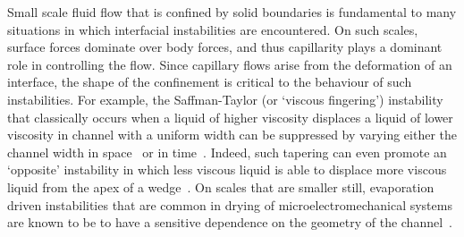 \documentclass{jfm}
\begin{document}

Small scale fluid flow that is confined by solid boundaries is fundamental to many situations in which interfacial instabilities are encountered.  On such scales, surface forces dominate over body forces, and thus capillarity plays a dominant role in controlling the flow. Since capillary flows arise from the deformation of an interface, the shape of the confinement is critical to the behaviour of such instabilities. For example, the Saffman-Taylor (or `viscous fingering') instability~\citep{Saffman1958PRSL} that classically occurs when a liquid of higher viscosity displaces a liquid of lower viscosity in channel with a uniform width can be suppressed by varying either the channel width in space~\citep{AlHousseiny2012NaturePhysics, AlHousseiny2013PhysFlu, Reyssat2014JFM} or in time~\citep{Zheng2015PRL}. Indeed, such tapering can even promote an `opposite' instability in which less viscous liquid is able to displace more viscous liquid from the apex of a wedge~\citep{Keiser2016JFM}. On scales that are smaller still, evaporation driven instabilities that are common in drying of microelectromechanical systems are known to be to have a sensitive dependence on the geometry of the channel~\citep{LedesmaAguilar2017SoftMatter, Hadjittofis2016JFM}.
\end{document}
